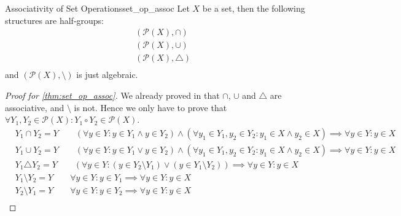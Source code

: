 \begin{theorem}{Associativity of Set Operations}{set_op_assoc}
    Let $X$ be a set, then the following structures are half-groups:
    \begin{equation}
        \begin{aligned}
            &(\mathcal{P}(X),\cap)\\
            &(\mathcal{P}(X),\cup)\\
            &(\mathcal{P}(X),\triangle)\\
        \end{aligned}\label{eq:assoc_set_ops}
    \end{equation}
    and $(\mathcal{P}(X),\setminus)$ is just algebraic.
\end{theorem}
\begin{proof}[Proof for \autoref{thm:set_op_assoc}]\label{proof:assoc_set_ops}
    We already proved in  that $\cap$, $\cup$ and $\triangle$ are associative,
    and $\setminus$ is not. Hence we only have to prove that 
    $\forall Y_1,Y_2\in\mathcal{P}(X)\colon Y_1\circ Y_2\in\mathcal{P}(X)$.
    \begin{align*}
        &Y_1\cap Y_2 = Y\qquad (\forall y\in Y\colon y\in Y_1\wedge y\in Y_2) \wedge (\forall y_1\in Y_1,y_2\in Y_2
        \colon y_1\in X\wedge y_2\in X)\implies \forall y\in Y\colon y\in X\\
        &Y_1\cup Y_2 = Y\qquad (\forall y\in Y\colon y\in Y_1\vee y\in Y_2)\wedge (\forall y_1\in Y_1,y_2\in Y_2
        \colon y_1\in X\wedge y_2\in X)\implies \forall y\in Y\colon y\in X\\
        &Y_1\triangle Y_2 = Y\qquad (\forall y\in Y\colon (y\in Y_2\setminus Y_1)\vee (y\in Y_1\setminus Y_2))
        \implies \forall y\in Y\colon y\in X\\
        &Y_1\setminus Y_2 = Y\qquad \forall y\in Y\colon y\in Y_1 \implies \forall y\in Y\colon y\in X\\
        &Y_2\setminus Y_1 = Y\qquad \forall y\in Y\colon y\in Y_2 \implies \forall y\in Y\colon y\in X\\
    \end{align*}
\end{proof}